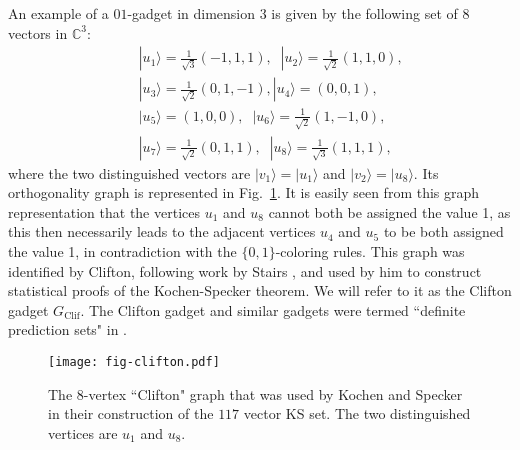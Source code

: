 \documentclass[twocolumn, a4paper, superscriptaddress,nofootinbib, accepted=2020-08-07, hyperref]{quantumarticle}
\begin{document}
An example of a $01$-gadget in dimension 3 is given by the following set of 8 vectors in $\mathbb{C}^3$:
\begin{eqnarray}
	\label{eq:Clif-orth-rep}
&&	| u_1 \rangle = \frac{1}{\sqrt{3}}(-1,1,1), \; \; |u_2 \rangle = \frac{1}{\sqrt{2}}(1,1,0), \nonumber \\ 
&& |u_3 \rangle = \frac{1}{\sqrt{2}} (0,1,-1), |u_4 \rangle = (0,0,1), \nonumber \\
&&	|u_5 \rangle = (1,0,0), \; \; |u_6 \rangle = \frac{1}{\sqrt{2}}(1,-1,0), \nonumber \\
&& |u_7 \rangle = \frac{1}{\sqrt{2}}(0,1,1), \; \; |u_8 \rangle = \frac{1}{\sqrt{3}}(1,1,1), 
	\end{eqnarray}
where the two distinguished vectors are $|v_1\rangle=|u_1\rangle$ and $|v_2\rangle=|u_8\rangle$. Its  orthogonality graph is represented in Fig.~\ref{fig:Clifton}. It is easily seen from this graph representation that the vertices $u_1$ and $u_8$ cannot both be assigned the value 1, as this then necessarily leads to the adjacent vertices $u_4$ and $u_5$ to be both assigned the value 1, in contradiction with the $\{0,1\}$-coloring rules. This graph was identified by Clifton, following work by Stairs \cite{Clifton93, Stairs}, and used by him to construct statistical proofs of the Kochen-Specker theorem. We will refer to it as the Clifton gadget $G_{\text{Clif}}$. The Clifton gadget and similar gadgets were termed ``definite prediction sets" in \cite{CA96}. 
\begin{figure}[t]
	\centerline{\texttt{[image: fig-clifton.pdf]}}
	\caption{The $8$-vertex ``Clifton" graph that was used by Kochen and Specker in their construction of the $117$ vector KS set. The two distinguished vertices are $u_1$ and $u_8$.}
	\label{fig:Clifton}
\end{figure}
\end{document}
